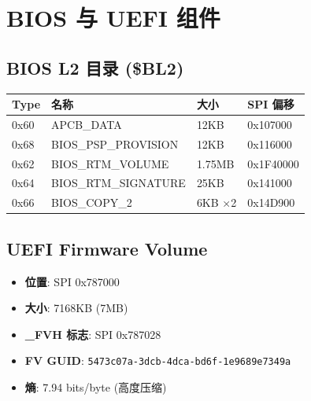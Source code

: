 \documentclass[a4paper,11pt,fontset=none]{ctexart}
\begin{document}
\begin{center}
\end{center}

\section{BIOS 与 UEFI 组件}

\subsection{BIOS L2 目录 (\$BL2)}

\begin{tabular}{R{1cm} p{5cm} R{2cm} R{3cm}}
  \toprule
  \textbf{Type} & \textbf{名称} & \textbf{大小} & \textbf{SPI 偏移} \\
  \midrule
  0x60 & APCB\_DATA & 12KB & 0x107000 \\
  0x68 & BIOS\_PSP\_PROVISION & 12KB & 0x116000 \\
  0x62 & BIOS\_RTM\_VOLUME & 1.75MB & 0x1F40000 \\
  0x64 & BIOS\_RTM\_SIGNATURE & 25KB & 0x141000 \\
  0x66 & BIOS\_COPY\_2 & 6KB ×2 & 0x14D900 \\
  \bottomrule
\end{tabular}

\subsection{UEFI Firmware Volume}

\begin{itemize}[nosep]
  \item \textbf{位置}: SPI 0x787000
  \item \textbf{大小}: 7168KB (7MB)
  \item \textbf{\_FVH 标志}: SPI 0x787028
  \item \textbf{FV GUID}: \texttt{5473c07a-3dcb-4dca-bd6f-1e9689e7349a}
  \item \textbf{熵}: 7.94 bits/byte (高度压缩)
\end{itemize}
\end{document}
